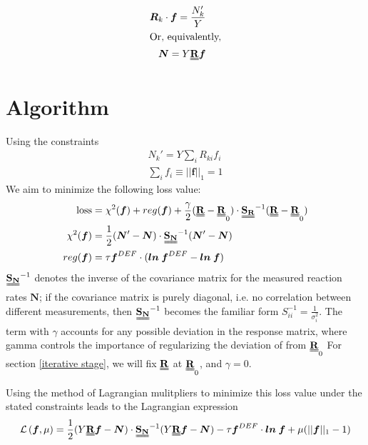 \documentclass[a4paper, 12pt]{article}
\newcommand{\matr}[1]{\uuline{\bf{#1}}}
\newcommand{\ve}[1]{\boldsymbol{#1}}
\newcommand{\covarN}{\matr{S_N}^{-1}}
\newcommand{\covarR}{\matr{S_R}^{-1}}
\begin{document}
    \begin{align}
        \ve{R}_k \cdot \ve{f} = \frac{N_k'}{Y}\\
    \intertext{Or, equivalently,}
        \ve{N} = Y \matr{R} \ve{f}\label{Folding equation}
    \end{align}
    


\section{Algorithm}\label{Algorithm}
Using the constraints
\begin{align*}
    N_k' = Y\sum_{i}R_{ki} f_i\\
    \sum_i f_i \equiv ||\ve{f}||_1 = 1
\end{align*}
We aim to minimize the following loss value:
\begin{align*}
    \text{loss} &= \chi^2(\ve{f}) + reg(\ve{f}) 
    + \frac{\gamma}{2} (\matr{R}- \matr{R}_0)\cdot\covarR(\matr{R} - \matr{R}_0)
    \\
    \chi^2(\ve{f}) &= \frac{1}{2} (\ve{N}'-\ve{N})\cdot\covarN(\ve{N}'-\ve{N})\\
    reg(\ve{f}) &= \tau \ve{f}^{DEF}\cdot(\ve{ln\:f}^{DEF}-\ve{ln\:f})
\end{align*}
$\covarN$ denotes the inverse of the covariance matrix for the measured reaction rates $\ve{N}$; if the covariance matrix is purely diagonal, i.e. no correlation between different measurements, then $\covarN$ becomes the familiar form $S^{-1}_{ii}=\frac{1}{\sigma_i^2}$.
The term with $\gamma$ accounts for any possible deviation in the response matrix, where gamma controls the importance of regularizing the deviation of \matr{R} from $\matr{R}_0$ For section \ref{iterative stage}, we will fix $\matr{R}$ at $\matr{R}_0$, and $\gamma=0$.

Using the method of Lagrangian mulitpliers to minimize this loss value under the stated constraints leads to the Lagrangian expression
\begin{align*}
    \mathcal{L}\left(\ve{f},\mu\right) = \frac{1}{2}(Y\matr{R}\ve{f}-\ve{N})\cdot\covarN(Y\matr{R}\ve{f}-\ve{N})-\tau\ve{f}^{DEF}\cdot\ve{ln\:f} +\mu(||\ve{f}||_1 -1)
\end{align*}
\end{document}
